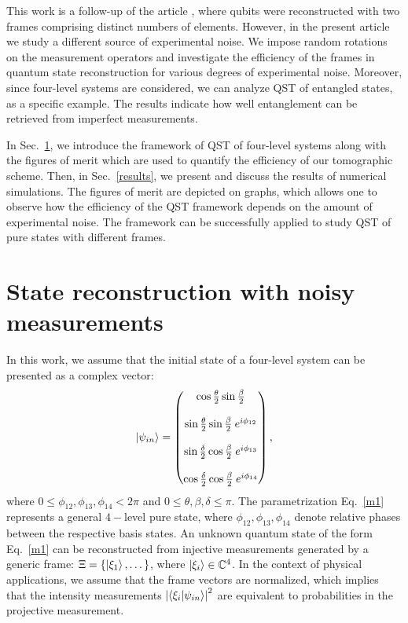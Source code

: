 \documentclass[aps,pra,reprint,groupedaddress,showkeys]{revtex4-1}
\renewcommand{\eqref}[1]{Eq.~\ref{#1}}
\begin{document}
This work is a follow-up of the article \cite{Czerwinski2020b}, where qubits were reconstructed with two frames comprising distinct numbers of elements. However, in the present article we study a different source of experimental noise. We impose random rotations on the measurement operators and investigate the efficiency of the frames in quantum state reconstruction for various degrees of experimental noise. Moreover, since four-level systems are considered, we can analyze QST of entangled states, as a specific example. The results indicate how well entanglement can be retrieved from imperfect measurements.

In Sec.~\ref{method}, we introduce the framework of QST of four-level systems along with the figures of merit which are used to quantify the efficiency of our tomographic scheme. Then, in Sec.~\ref{results}, we present and discuss the results of numerical simulations. The figures of merit are depicted on graphs, which allows one to observe how the efficiency of the QST framework depends on the amount of experimental noise. The framework can be successfully applied to study QST of pure states with different frames.

\section{State reconstruction with noisy measurements}\label{method}

In this work, we assume that the initial state of a four-level system can be presented as a complex vector:
\begin{equation}\label{m1}
\ket{\psi_{in}} =\begin{pmatrix} \cos \frac{\theta}{2} \sin \frac{\beta}{2}  \\ 
\\
 \sin \frac{\theta}{2} \sin \frac{\beta}{2} \: e^{i \phi_{12}}\\
 \\
 \sin \frac{\delta}{2} \cos \frac{\beta}{2}  \: e^{i \phi_{13}}\\
 \\
  \cos \frac{\delta}{2}  \cos \frac{\beta}{2} \: e^{i \phi_{14}} \end{pmatrix},
\end{equation}
where $ 0\leq \phi_{12}, \phi_{13}, \phi_{14} < 2 \pi$ and $0\leq \theta, \beta, \delta \leq \pi$. The parametrization \eqref{m1} represents a general $4-$level pure state, where $\phi_{12}, \phi_{13}, \phi_{14}$ denote relative phases between the respective basis states. An unknown quantum state of the form \eqref{m1} can be reconstructed from injective measurements generated by a generic frame: $\Xi = \{ \ket{\xi_1}, \dots\}$, where $\ket{\xi_i} \in \mathbb{C}^4$. In the context of physical applications, we assume that the frame vectors are normalized, which implies that the intensity measurements $\left|\braket{\xi_i | \psi_{in}}\right|^2$ are equivalent to probabilities in the projective measurement.
\end{document}
